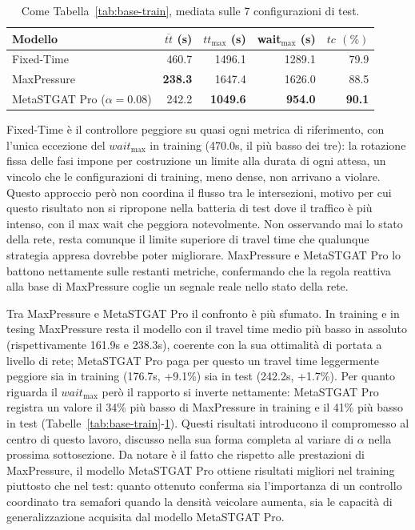 \begin{table}[htbp]
  \centering
  \begin{tabular}{@{}lrrrr@{}}
    \toprule
    Modello                       & $\overline{tt}$ (s) & $tt_{\max}$ (s) & wait$_{\max}$ (s) & $tc$ $(\%)$   \\
    \midrule
    Fixed-Time                    & 460.7               & 1496.1          & 1289.1            & 79.9          \\
    MaxPressure                   & \textbf{238.3}      & 1647.4          & 1626.0            & 88.5          \\
    MetaSTGAT Pro ($\alpha=0.08$) & 242.2               & \textbf{1049.6} & \textbf{954.0}    & \textbf{90.1} \\
    \bottomrule
  \end{tabular}
  \caption{Come Tabella~\ref{tab:base-train}, mediata sulle 7 configurazioni
    di test.}
  \label{tab:base-test}
\end{table}

Fixed-Time è il controllore peggiore su quasi ogni metrica di riferimento,
con l'unica eccezione del $wait_{\max}$ in training (470.0s, il più basso dei tre):
la rotazione fissa delle fasi impone per costruzione un
limite alla durata di ogni attesa, un vincolo che le configurazioni di
training, meno dense, non arrivano a violare.
Questo approccio però non coordina il flusso tra le intersezioni, motivo per cui
questo risultato non si ripropone nella batteria di test dove il traffico è più intenso,
con il max wait che peggiora notevolmente.
Non osservando mai lo stato della rete, resta comunque il limite superiore di
travel time che qualunque strategia appresa dovrebbe poter migliorare.
MaxPressure e MetaSTGAT Pro lo battono nettamente sulle restanti metriche,
confermando che la regola reattiva alla base di MaxPressure coglie un segnale reale nello stato della rete.

Tra MaxPressure e MetaSTGAT Pro il confronto è più sfumato. In training e in tesing MaxPressure
resta il modello con il travel time medio più basso in assoluto (rispettivamente 161.9s e 238.3s),
coerente con la sua ottimalità di portata a livello di rete;
MetaSTGAT Pro paga per questo un travel time leggermente peggiore sia in training (176.7s, +9.1\%) sia in test (242.2s, +1.7\%).
Per quanto riguarda il $wait_{\max}$ però il rapporto si inverte nettamente:
MetaSTGAT Pro registra un valore il 34\% più basso di MaxPressure in training e il 41\% più basso in test
(Tabelle~\ref{tab:base-train}-\ref{tab:base-test}).
Questi risultati introducono il compromesso al centro di questo lavoro, discusso nella sua forma
completa al variare di $\alpha$ nella prossima sottosezione.
Da notare è il fatto che rispetto alle prestazioni di MaxPressure, il modello MetaSTGAT Pro
ottiene risultati migliori nel training piuttosto che nel test: quanto ottenuto conferma sia
l'importanza di un controllo coordinato tra semafori quando la densità veicolare aumenta, sia
le capacità di generalizzazione acquisita dal modello MetaSTGAT Pro.

